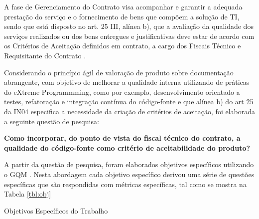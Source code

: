 A fase de Gerenciamento do Contrato visa acompanhar e garantir a adequada prestação do serviço e o fornecimento de bens que compõem a solução de TI, sendo que está disposto no art. 25 III, alínea b), que a avaliação da qualidade dos serviços realizados ou dos bens entregues e justificativas deve estar de acordo com os Critérios de Aceitação definidos em contrato, a cargo dos Fiscais Técnico e Requisitante do Contrato \cite{IN04:2010}.

Considerando o princípio ágil de valoração de produto sobre documentação abrangente, com objetivo de melhorar a qualidade interna utilizando de práticas do eXtreme Programmming, como por exemplo, desenvolvimento orientado a testes, refatoração e integração contínua do código-fonte \cite{beck1999} e que alínea b) do art 25 da IN04 especifica a necessidade da criação de critérios de aceitação, foi elaborada a seguinte questão de pesquisa: 

\textbf{Como incorporar, do ponto de vista do fiscal técnico do contrato, a qualidade do código-fonte como critério de aceitabilidade do produto?} 

A partir da questão de pesquisa, foram elaborados objetivos específicos utilizando o GQM \cite{Basili96b}. Nesta abordagem cada objetivo específico derivou uma série de questões específicas que são respondidas com métricas específicas, tal como se mostra na Tabela \ref{tbl:obj}

\begin{table}[ht]
\centering

\caption{Objetivos Específicos do Trabalho}
\label{tbl:obj} 
\end{table}
\FloatBarrier